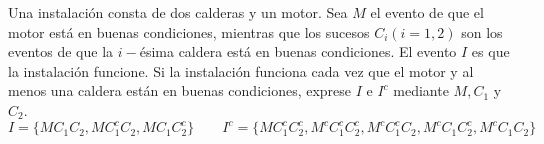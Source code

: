 \item Una instalación consta de dos calderas y un motor. Sea $M$ el evento de que el motor está en buenas condiciones, mientras que los sucesos $C_i(i=1,2)$ son los eventos de que la $i-$ésima caldera está en buenas condiciones. El evento $I$ es que la instalación funcione. Si la instalación funciona cada vez que el motor y al menos una caldera están en buenas condiciones, exprese $I$ e $I^c$ mediante $M,C_1$ y $C_2$.
    \[I=\{MC_1C_2,MC_1^cC_2,MC_1C_2^c\}\qquad I^c=\{MC_1^cC_2^c,M^cC_1^cC_2^c,M^cC_1^cC_2,M^cC_1C_2^c,M^cC_1C_2\}\]